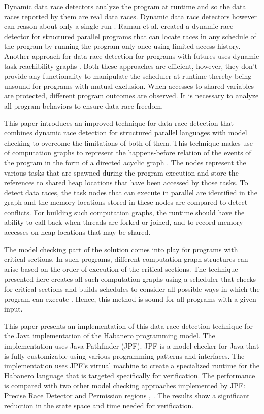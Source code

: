 Dynamic data race detectors analyze the program at runtime and so the data races reported by them are real data races. Dynamic data race detectors however can reason about only a single run \cite{flanagan2009fasttrack, savage1997eraser, mellor1991fly, schonberg1989fly, Feng97efficientdetection, Async-Finish-Race}. Raman et al. created a dynamic race detector for structured parallel programs that can locate races in any schedule of the program by running the program only once using limited access history\cite{raman2012scalable}. Another approach for data race detection for programs with futures uses dynamic task reachibility graphs \cite{drdForFutures}. Both these approaches are efficient, however, they don't provide any functionality to manipulate the scheduler at runtime thereby being unsound for programs with mutual exclusion. When accesses to shared variables are protected, different program outcomes are observed. It is necessary to analyze all program behaviors to ensure data race freedom.

This paper introduces an improved technique for data race detection that combines dynamic race detection for structured parallel languages with model checking to overcome the limitations of both of them. This technique makes use of computation graphs to represent the happens-before relation of the events of the program in the form of a directed acyclic graph \cite{dennis2012determinacy}. The nodes represent the various tasks that are spawned during the program execution and store the references to shared heap locations that have been accessed by those tasks. To detect data races, the task nodes that can execute in parallel are identified in the graph and the memory locations stored in these nodes are compared to detect conflicts. For building such computation graphs, the runtime should have the ability to call-back when threads are forked or joined, and to record memory accesses on heap locations that may be shared.

The model checking part of the solution comes into play for programs with critical sections. In such programs, different computation graph structures can arise based on the order of execution of the critical sections. The technique presented here creates all such computation graphs using a scheduler that checks for critical sections and builds schedules to consider all possible ways in which the program can execute \cite{mercer2015model}. Hence, this method is sound for all programs with a given input.  

This paper presents an implementation of this data race detection technique for the Java implementation of the Habanero programming model. The implementation uses Java Pathfinder (JPF). JPF is a model checker for Java that is fully customizable using various programming patterns and interfaces. The implementation uses JPF's virtual machine to create a specialized runtime for the Habanero language that is targeted specifically for verification\cite{mercer2015model, anderson2014jpf}. 
The performance is compared with two other model checking approaches implemented by JPF: Precise Race Detector and Permission regions \cite{kulikov2010detecting}, \cite{mercer2015model}. The results show a significant reduction in the state space and time needed for verification.


